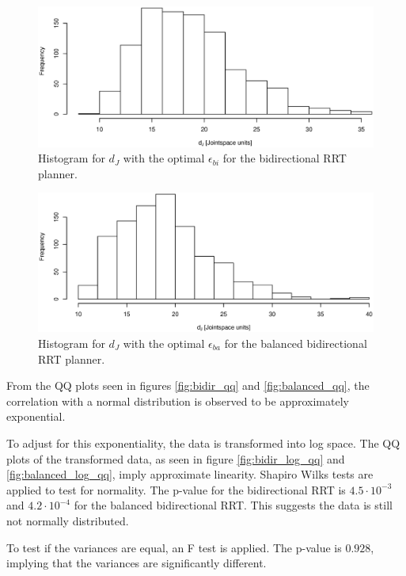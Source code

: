 \begin{figure}[h]
 \centering
 \includegraphics[width=\figsize]{graphics/hist_op_bi}
 \caption{Histogram for \(d_J\) with the optimal \(\epsilon_{bi}\) for the bidirectional RRT planner.}
 \label{fig:bidir_histogram}
\end{figure}

\begin{figure}[h]
 \centering
 \includegraphics[width=\figsize]{graphics/hist_op_ba}
 \caption{Histogram for \(d_J\) with the optimal \(\epsilon_{ba}\) for the balanced bidirectional RRT planner.}
 \label{fig:balanced_histogram}
\end{figure}

From the QQ plots seen in figures \ref{fig:bidir_qq} and \ref{fig:balanced_qq},
the correlation with a normal distribution is observed to be approximately exponential.

To adjust for this exponentiality, the data is transformed into log space.
The QQ plots of the transformed data,
as seen in figure \ref{fig:bidir_log_qq} and \ref{fig:balanced_log_qq},
imply approximate linearity.
Shapiro Wilks tests are applied to test for normality.
The p-value for the bidirectional RRT is \(4.5\cdot10^{-3}\)
and \(4.2\cdot10^{-4}\) for the balanced bidirectional RRT.
This suggests the data is still not normally distributed.

To test if the variances are equal, an F test is applied.
The p-value is \(0.928\), implying that the variances are significantly different.

